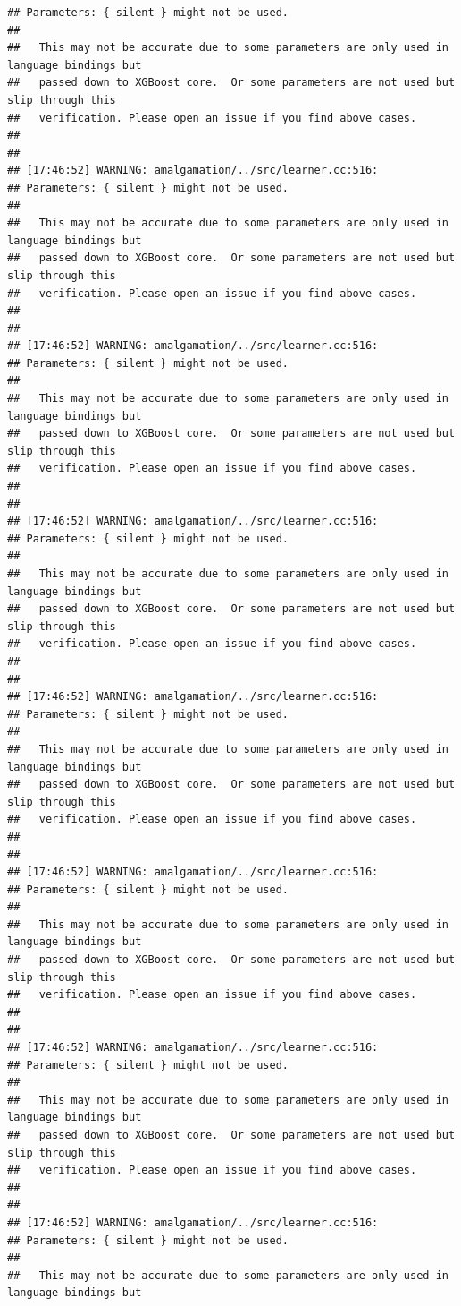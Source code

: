 \documentclass[AMS,STIX2COL]{WileyNJD-v2}\usepackage[]{graphicx}\usepackage[]{color}
\makeatletter
\newenvironment{kframe}{%
 \def\at@end@of@kframe{}%
 \ifinner\ifhmode%
  \def\at@end@of@kframe{\end{minipage}}%
  \begin{minipage}{\columnwidth}%
 \fi\fi%
 \def\FrameCommand##1{\hskip\@totalleftmargin \hskip-\fboxsep
 \colorbox{shadecolor}{##1}\hskip-\fboxsep
     \hskip-\linewidth \hskip-\@totalleftmargin \hskip\columnwidth}%
 \MakeFramed {\advance\hsize-\width
   \@totalleftmargin\z@ \linewidth\hsize
   \@setminipage}}%
 {\par\unskip\endMakeFramed%
 \at@end@of@kframe}
\newenvironment{knitrout}{}{} %
\makeatother
\begin{document}
\begin{knitrout}
\begin{kframe}
\begin{verbatim}
## Parameters: { silent } might not be used.
## 
##   This may not be accurate due to some parameters are only used in language bindings but
##   passed down to XGBoost core.  Or some parameters are not used but slip through this
##   verification. Please open an issue if you find above cases.
## 
## 
## [17:46:52] WARNING: amalgamation/../src/learner.cc:516: 
## Parameters: { silent } might not be used.
## 
##   This may not be accurate due to some parameters are only used in language bindings but
##   passed down to XGBoost core.  Or some parameters are not used but slip through this
##   verification. Please open an issue if you find above cases.
## 
## 
## [17:46:52] WARNING: amalgamation/../src/learner.cc:516: 
## Parameters: { silent } might not be used.
## 
##   This may not be accurate due to some parameters are only used in language bindings but
##   passed down to XGBoost core.  Or some parameters are not used but slip through this
##   verification. Please open an issue if you find above cases.
## 
## 
## [17:46:52] WARNING: amalgamation/../src/learner.cc:516: 
## Parameters: { silent } might not be used.
## 
##   This may not be accurate due to some parameters are only used in language bindings but
##   passed down to XGBoost core.  Or some parameters are not used but slip through this
##   verification. Please open an issue if you find above cases.
## 
## 
## [17:46:52] WARNING: amalgamation/../src/learner.cc:516: 
## Parameters: { silent } might not be used.
## 
##   This may not be accurate due to some parameters are only used in language bindings but
##   passed down to XGBoost core.  Or some parameters are not used but slip through this
##   verification. Please open an issue if you find above cases.
## 
## 
## [17:46:52] WARNING: amalgamation/../src/learner.cc:516: 
## Parameters: { silent } might not be used.
## 
##   This may not be accurate due to some parameters are only used in language bindings but
##   passed down to XGBoost core.  Or some parameters are not used but slip through this
##   verification. Please open an issue if you find above cases.
## 
## 
## [17:46:52] WARNING: amalgamation/../src/learner.cc:516: 
## Parameters: { silent } might not be used.
## 
##   This may not be accurate due to some parameters are only used in language bindings but
##   passed down to XGBoost core.  Or some parameters are not used but slip through this
##   verification. Please open an issue if you find above cases.
## 
## 
## [17:46:52] WARNING: amalgamation/../src/learner.cc:516: 
## Parameters: { silent } might not be used.
## 
##   This may not be accurate due to some parameters are only used in language bindings but

\end{verbatim}
\end{kframe}
\end{knitrout}
\end{document}
